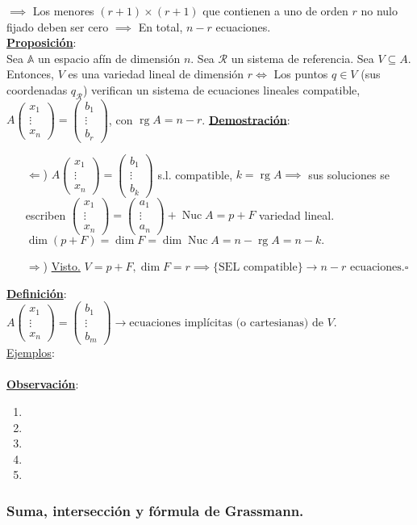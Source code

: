 \documentclass[11pt]{article}
\newcommand{\af}{\mathbb{A}}
\newcommand{\defi}{\underline{\textbf{Definición}}:\\}
\newcommand{\prop}{\underline{\textbf{Proposición}}:\\}
\newcommand{\dem}{\underline{\textbf{Demostración}}:\\}
\newcommand{\ej}{\underline{Ejemplos}:\\}
\newcommand{\obs}{\underline{\textbf{Observación}}: }
\DeclareMathOperator{\rg}{rg}
\DeclareMathOperator{\nuc}{Nuc}
\begin{document}
$\implies$ Los menores $(r+1)\times(r+1)$ que contienen a uno de orden $r$ no nulo fijado deben ser cero $\implies$ En total, $n-r$ ecuaciones.\\
\prop Sea $\af$ un espacio afín de dimensión $n$. Sea $\mathcal{R}$ un sistema de referencia. Sea $V\subseteq A$. Entonces, $V$ es una variedad lineal de dimensión $r\iff$ Los puntos $q\in V$ (sus coordenadas $q_{\mathcal{R}}$) verifican un sistema de ecuaciones lineales compatible, $A\begin{pmatrix}
x_1\\
\vdots\\
x_n
\end{pmatrix}=\begin{pmatrix}
b_1\\
\vdots\\
b_r
\end{pmatrix}
$, con $\rg A=n-r$.
\dem \begin{itemize}
	\item[$\Leftarrow$)] $A\begin{pmatrix}
	x_1\\ \vdots\\ x_n
	\end{pmatrix}=\begin{pmatrix}
	b_1\\ \vdots\\ b_k
	\end{pmatrix}$ s.l. compatible, $k=\rg A\implies$ sus soluciones se escriben $\begin{pmatrix}
	x_1\\ \vdots\\ x_n
	\end{pmatrix}=\begin{pmatrix}
	a_1\\ \vdots\\ a_n
	\end{pmatrix}+\nuc A=p+F
	$ variedad lineal. $\dim(p+F)=\dim F=\dim\nuc A=n-\rg A=n-k.$
	\item[$\Rightarrow$)] \underline{Visto.} $V=p+F,\dim F=r\implies\{\textrm{SEL compatible}\}\rightarrow n-r\textrm{ ecuaciones.}\square$
\end{itemize}
\defi $A\begin{pmatrix}
x_1\\ \vdots\\ x_n
\end{pmatrix}=\begin{pmatrix}
b_1\\ \vdots\\ b_m
\end{pmatrix}\rightarrow\textrm{ecuaciones implícitas (o cartesianas) de }V.$\\
\ej \\
\obs \begin{enumerate}
	\item
	\item
	\item
	\item
	\item
\end{enumerate}
\subsubsection{Suma, intersección y fórmula de Grassmann.}
\newpage

\newpage
\end{document}
